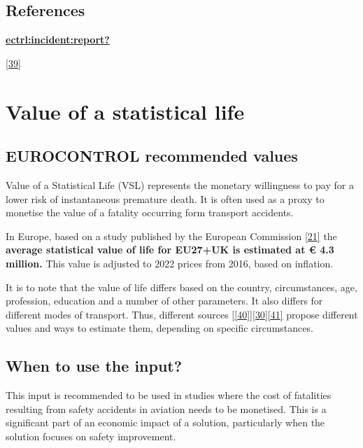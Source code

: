 \documentclass[
  11pt,
  a4paper,
]{book}
\begin{document}
\hypertarget{references-16}{%
\section{References}\label{references-16}}

\protect\hyperlink{ref-ectrl:incident:report}{\textbf{ectrl:incident:report?}}

\protect\hyperlink{ref-iata:safety:report}{{[}39{]}}

\hypertarget{sec-value-of-a-statistical-life}{%
\chapter{Value of a statistical
life}\label{sec-value-of-a-statistical-life}}

\hypertarget{eurocontrol-recommended-values-17}{%
\section{EUROCONTROL recommended
values}\label{eurocontrol-recommended-values-17}}

Value of a Statistical Life (VSL) represents the monetary willingness to
pay for a lower risk of instantaneous premature death. It is often used
as a proxy to monetise the value of a fatality occurring form transport
accidents.

In Europe, based on a study published by the European Commission
\protect\hyperlink{ref-ecdgmove2019}{{[}21{]}} the \textbf{average
statistical value of life for EU27+UK is estimated at € 4.3 million.}
This value is adjusted to 2022 prices from 2016, based on inflation.

It is to note that the value of life differs based on the country,
circumstances, age, profession, education and a number of other
parameters. It also differs for different modes of transport. Thus,
different sources
{[}\protect\hyperlink{ref-easa2013}{{[}40{]}}{]}\protect\hyperlink{ref-ecdgregio2014}{{[}30{]}}\protect\hyperlink{ref-ecbr2021}{{[}41{]}}
propose different values and ways to estimate them, depending on
specific circumstances.

\hypertarget{when-to-use-the-input-10}{%
\section{When to use the input?}\label{when-to-use-the-input-10}}

This input is recommended to be used in studies where the cost of
fatalities resulting from safety accidents in aviation needs to be
monetised. This is a significant part of an economic impact of a
solution, particularly when the solution focuses on safety improvement.
\end{document}
